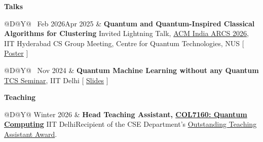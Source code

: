 \documentclass[11pt,letterpaper]{article}
\makeatletter
\newcommand{\cvsection}[1]{%
  \par\needspace{2.5\baselineskip}%
  \vspace{0.45\baselineskip}%
  {\large\bfseries\color{HeadingBlack} #1}\par
  \vspace{0.20\baselineskip}%
}
\newcommand{\datedentry}[2]{%
  \begin{tabularx}{\textwidth}{@{}D@{\hspace{0.08in}}Y@{}}
    \textcolor{DateSlate}{#1} & #2
  \end{tabularx}\par\vspace{0.16\baselineskip}%
}
\newcommand{\resourcelink}[3]{%
  \textcolor{BracketGray}{[}%
  \href{#2}{\textcolor{#1}{#3}}%
  \textcolor{BracketGray}{]}%
}
\makeatother
\begin{document}
\cvsection{Talks}

\datedentry{~\newline Feb 2026\newline Apr 2025}{%
  \textbf{Quantum and Quantum-Inspired Classical Algorithms for Clustering}\newline
  Invited Lightning Talk, \href{https://event.india.acm.org/arcs/home/}{ACM India ARCS 2026}, IIT Hyderabad\newline
  CS Group Meeting, Centre for Quantum Technologies, NUS\quad
  \resourcelink{PosterGreen}{https://iclr.cc/virtual/2025/poster/28068}{Poster}
}

\datedentry{~\newline Nov 2024}{%
  \textbf{Quantum Machine Learning without any Quantum}\newline
  \href{https://cstheory.iitd.ac.in/seminars.html}{TCS Seminar}, IIT Delhi\quad
  \resourcelink{LinkBlue}{https://drive.google.com/file/d/10hbt5_6Pd_qbcC5O_FxOspqenUsylO2V/view?usp=sharing}{Slides}
}

\cvsection{Teaching}

\datedentry{Winter 2026}{%
  \textbf{Head Teaching Assistant, \href{https://k-rajendra.github.io/courses/QuantumComputing/quantum252601.html}{COL7160: Quantum Computing}}\newline
  IIT Delhi\quad Recipient of the CSE Department's
  \href{https://homecse.iitd.ac.in/cse-iit-delhi-ta-award/}{Outstanding Teaching Assistant Award}.
}
\end{document}
